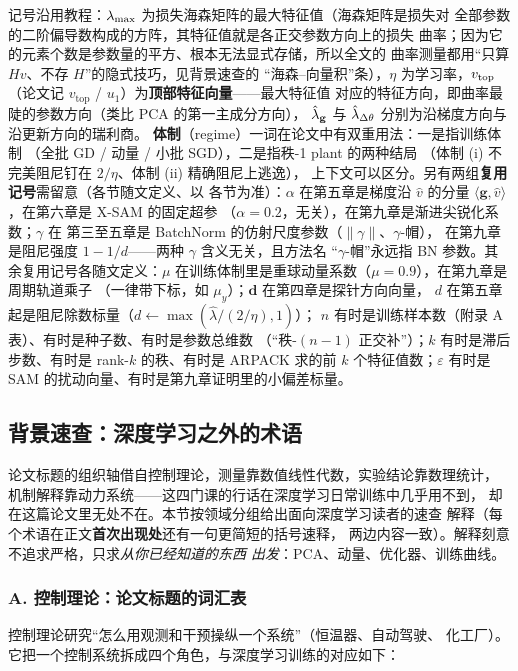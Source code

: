 记号沿用教程：$\lambda_{\max}$ 为损失海森矩阵的最大特征值（海森矩阵是损失对
全部参数的二阶偏导数构成的方阵，其特征值就是各正交参数方向上的损失
曲率；因为它的元素个数是参数量的平方、根本无法显式存储，所以全文的
曲率测量都用``只算 $Hv$、不存 $H$''的隐式技巧，见背景速查的
``海森--向量积''条），$\eta$ 为学习率，$v_{\mathrm{top}}$（论文记
$v_{\mathrm{top}}$ / $u_1$）为\textbf{顶部特征向量}——最大特征值
对应的特征方向，即曲率最陡的参数方向（类比 PCA 的第一主成分方向），
$\hat{\lambda}_{\mathbf{g}}$ 与 $\hat{\lambda}_{\Delta\theta}$ 分别为沿梯度方向与沿更新方向的瑞利商。
\textbf{体制}（regime）一词在论文中有双重用法：一是指训练体制
（全批 GD / 动量 / 小批 SGD），二是指秩-1 plant 的两种结局
（体制 (i) 不完美阻尼钉在 $2/\eta$、体制 (ii) 精确阻尼上逃逸），
上下文可以区分。另有两组\textbf{复用记号}需留意（各节随文定义、以
各节为准）：$\alpha$ 在第五章是梯度沿 $\hat v$ 的分量
$\langle\mathbf{g},\hat v\rangle$，在第六章是 X-SAM 的固定超参
（$\alpha{=}0.2$，无关），在第九章是渐进尖锐化系数；$\gamma$ 在
第三至五章是 BatchNorm 的仿射尺度参数（$\|\gamma\|$、$\gamma$-帽），
在第九章是阻尼强度 $1-1/d$——两种 $\gamma$ 含义无关，且方法名
``$\gamma$-帽''永远指 BN 参数。其余复用记号各随文定义：$\mu$
在训练体制里是重球动量系数（$\mu{=}0.9$），在第九章是周期轨道乘子
（一律带下标，如 $\mu_y$）；$\mathbf{d}$ 在第四章是探针方向向量，
$d$ 在第五章起是阻尼除数标量（$d\gets\max(\hat\lambda/(2/\eta),1)$）；
$n$ 有时是训练样本数（附录 A 表）、有时是种子数、有时是参数总维数
（``秩-$(n{-}1)$ 正交补''）；$k$ 有时是滞后步数、有时是 rank-$k$
的秩、有时是 ARPACK 求的前 $k$ 个特征值数；$\varepsilon$ 有时是
SAM 的扰动向量、有时是第九章证明里的小偏差标量。

\subsection{背景速查：深度学习之外的术语}\label{sec:ch00-glossary}

论文标题的组织轴借自控制理论，测量靠数值线性代数，实验结论靠数理统计，
机制解释靠动力系统——这四门课的行话在深度学习日常训练中几乎用不到，
却在这篇论文里无处不在。本节按领域分组给出面向深度学习读者的速查
解释（每个术语在正文\textbf{首次出现处}还有一句更简短的括号速释，
两边内容一致）。解释刻意不追求严格，只求\emph{从你已经知道的东西
出发}：PCA、动量、优化器、训练曲线。

\subsubsection*{A. 控制理论：论文标题的词汇表}

控制理论研究``怎么用观测和干预操纵一个系统''（恒温器、自动驾驶、
化工厂）。它把一个控制系统拆成四个角色，与深度学习训练的对应如下：


